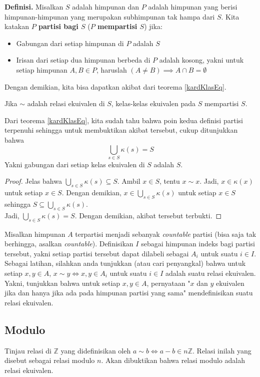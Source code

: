 	\textbf{Definisi. }Misalkan $S$ adalah himpunan dan $P$ adalah himpunan yang berisi himpunan-himpunan yang merupakan subhimpunan tak hampa dari $S$. Kita katakan \textbf{$P$ partisi bagi $S$} (\textbf{$P$ mempartisi $S$}) jika: \begin{itemize}
		\item Gabungan dari setiap himpunan di $P$ adalah $S$
		\item Irisan dari setiap dua himpunan berbeda di $P$ adalah kosong, yakni untuk setiap himpunan $A,B \in P$, haruslah $(A \ne B) \implies A \cap B = \emptyset$
	\end{itemize}
	Dengan demikian, kita bisa dapatkan akibat dari teorema \ref{kardKlasEq}.
	\begin{corollary}
		Jika $\sim$ adalah relasi ekuivalen di $S$, kelas-kelas ekuivalen pada $S$ mempartisi $S$.
	\end{corollary}
	Dari teorema \ref{kardKlasEq}, kita sudah tahu bahwa poin kedua definisi partisi terpenuhi sehingga untuk membuktikan akibat tersebut, cukup ditunjukkan bahwa
	$$\bigcup_{s \in S} \kappa(s) = S$$
	Yakni gabungan dari setiap kelas ekuivalen di $S$ adalah $S$.
	\begin{proof}
		Jelas bahwa $\bigcup_{s \in S} \kappa(s) \subseteq S$. Ambil $x \in S$, tentu $x \sim x$. Jadi, $x \in \kappa(x)$ untuk setiap $x \in S$. Dengan demikian, $x \in \bigcup_{s \in S} \kappa(s)$ untuk setiap $x \in S$ sehingga $S \subseteq \bigcup_{s \in S} \kappa(s)$.
		\\
		
		Jadi, $\bigcup_{s \in S} \kappa(s) = S$. Dengan demikian, akibat tersebut terbukti.
	\end{proof}
	
	Misalkan himpunan $A$ terpartisi menjadi sebanyak \textit{countable} partisi (bisa saja tak berhingga, asalkan \textit{countable}). Definisikan $I$ sebagai himpunan indeks bagi partisi tersebut, yakni setiap partisi tersebut dapat dilabeli sebagai $A_i$ untuk suatu $i \in I$. Sebagai latihan, silahkan anda tunjukkan (atau cari penyangkal) bahwa untuk setiap $x,y \in A$, $x \sim y \iff x,y \in A_i$ untuk suatu $i \in I$ adalah suatu relasi ekuivalen. Yakni, tunjukkan bahwa untuk setiap $x,y \in A$, pernyataan "$x$ dan $y$ ekuivalen jika dan hanya jika ada pada himpunan partisi yang sama" mendefinisikan suatu relasi ekuivalen.
	\subsection{Modulo}
	Tinjau relasi di $\mathbb{Z}$ yang didefinisikan oleh $a \sim b \iff a - b \in n\mathbb{Z}$. Relasi inilah yang disebut sebagai relasi modulo $n$. Akan dibuktikan bahwa relasi modulo adalah relasi ekuivalen.
	\\
	
